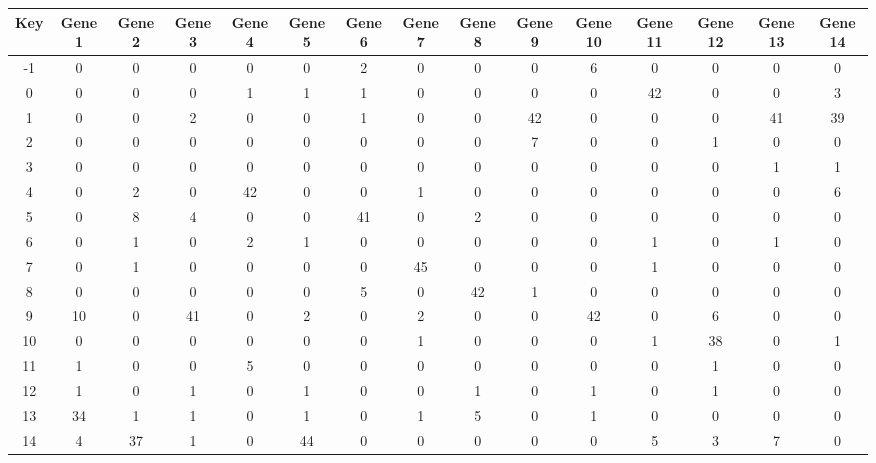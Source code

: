 \begin{tabular}{|c|c|c|c|c|c|c|c|c|c|c|c|c|c|c|}
\hline
Key & Gene 1 & Gene 2 & Gene 3 & Gene 4 & Gene 5 & Gene 6 & Gene 7 & Gene 8 & Gene 9 & Gene 10 & Gene 11 & Gene 12 & Gene 13 & Gene 14 \\
\hline
-1 & 0 & 0 & 0 & 0 & 0 & 2 & 0 & 0 & 0 & 6 & 0 & 0 & 0 & 0 \\
0 & 0 & 0 & 0 & 1 & 1 & 1 & 0 & 0 & 0 & 0 & 42 & 0 & 0 & 3 \\
1 & 0 & 0 & 2 & 0 & 0 & 1 & 0 & 0 & 42 & 0 & 0 & 0 & 41 & 39 \\
2 & 0 & 0 & 0 & 0 & 0 & 0 & 0 & 0 & 7 & 0 & 0 & 1 & 0 & 0 \\
3 & 0 & 0 & 0 & 0 & 0 & 0 & 0 & 0 & 0 & 0 & 0 & 0 & 1 & 1 \\
4 & 0 & 2 & 0 & 42 & 0 & 0 & 1 & 0 & 0 & 0 & 0 & 0 & 0 & 6 \\
5 & 0 & 8 & 4 & 0 & 0 & 41 & 0 & 2 & 0 & 0 & 0 & 0 & 0 & 0 \\
6 & 0 & 1 & 0 & 2 & 1 & 0 & 0 & 0 & 0 & 0 & 1 & 0 & 1 & 0 \\
7 & 0 & 1 & 0 & 0 & 0 & 0 & 45 & 0 & 0 & 0 & 1 & 0 & 0 & 0 \\
8 & 0 & 0 & 0 & 0 & 0 & 5 & 0 & 42 & 1 & 0 & 0 & 0 & 0 & 0 \\
9 & 10 & 0 & 41 & 0 & 2 & 0 & 2 & 0 & 0 & 42 & 0 & 6 & 0 & 0 \\
10 & 0 & 0 & 0 & 0 & 0 & 0 & 1 & 0 & 0 & 0 & 1 & 38 & 0 & 1 \\
11 & 1 & 0 & 0 & 5 & 0 & 0 & 0 & 0 & 0 & 0 & 0 & 1 & 0 & 0 \\
12 & 1 & 0 & 1 & 0 & 1 & 0 & 0 & 1 & 0 & 1 & 0 & 1 & 0 & 0 \\
13 & 34 & 1 & 1 & 0 & 1 & 0 & 1 & 5 & 0 & 1 & 0 & 0 & 0 & 0 \\
14 & 4 & 37 & 1 & 0 & 44 & 0 & 0 & 0 & 0 & 0 & 5 & 3 & 7 & 0 \\
\hline
\end{tabular}